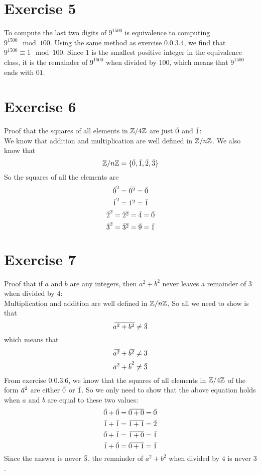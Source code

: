 \documentclass[12pt]{article}
\begin{document}
    \section*{Exercise 5}
    To compute the last two digits of $9^{1500}$
    is equivalence to computing $9^{1500} \mod 100$.
    Using the same method as exercise 0.0.3.4,
    we find that $9^{1500} \equiv 1 \mod 100$.
    Since $1$ is the smallest positive integer
    in the equivalence class,
    it is the remainder of $9^{1500}$ when divided by $100$,
    which means that $9^{1500}$ ends with $01$. \\

    \section*{Exercise 6}
    Proof that the squares of all elements in $\mathbb{Z}/4\mathbb{Z}$
    are just $\,\overline{\!{0}}$ and $\,\overline{\!{1}}$: \\
    We know that addition and multiplication are well defined
    in $\mathbb{Z}/n\mathbb{Z}$.
    We also know that
    \[\mathbb{Z}/n\mathbb{Z} = \{ \,\overline{\!{0}}, \,\overline{\!{1}}, \,\overline{\!{2}}, \,\overline{\!{3}} \}\]
    So the squares of all the elements are
    \[ \,\overline{\!{0}}^2 = \,\overline{\!{0^2}} = \,\overline{\!{0}} \]
    \[ \,\overline{\!{1}}^2 = \,\overline{\!{1^2}} = \,\overline{\!{1}} \]
    \[ \,\overline{\!{2}}^2 = \,\overline{\!{2^2}} = \,\overline{\!{4}} = \,\overline{\!{0}} \]
    \[ \,\overline{\!{3}}^2 = \,\overline{\!{3^2}} = \,\overline{\!{9}} = \,\overline{\!{1}} \]

    \section*{Exercise 7}
    Proof that if $a$ and $b$ are any integers,
    then $a^2 + b^2$ never leaves a remainder of $3$
    when divided by $4$: \\
    Multiplication and addition are well defined in $\mathbb{Z}/n\mathbb{Z}$,
    So all we need to show is that
    \[ \,\overline{\!{a^2 + b^2}} \neq \,\overline{\!{3}} \]
    which means that 
    \[ \,\overline{\!{a^2}} + \,\overline{\!{b^2}} \neq \,\overline{\!{3}} \]
    \[ \,\overline{\!{a}}^2 + \,\overline{\!{b}}^2 \neq \,\overline{\!{3}} \]
    From exercise 0.0.3.6,
    we know that the squares of all elements in $\mathbb{Z}/4\mathbb{Z}$
    of the form $\,\overline{\!{a}}^2$
    are either $\,\overline{\!{0}}$ or $\,\overline{\!{1}}$.
    So we only need to show that the above equation
    holds when $a$ and $b$ are equal to these two values:
    \[ \,\overline{\!{0}} + \,\overline{\!{0}} = \,\overline{\!{0 + 0}} = \,\overline{\!{0}} \]
    \[ \,\overline{\!{1}} + \,\overline{\!{1}} = \,\overline{\!{1 + 1}} = \,\overline{\!{2}} \]
    \[ \,\overline{\!{0}} + \,\overline{\!{1}} = \,\overline{\!{1 + 0}} = \,\overline{\!{1}} \]
    \[ \,\overline{\!{1}} + \,\overline{\!{0}} = \,\overline{\!{0 + 1}} = \,\overline{\!{1}} \]
    Since the answer is never $\,\overline{\!{3}}$,
    the remainder of $a^2 + b^2$ when divided by $4$
    is never $3$. \\
\end{document}
